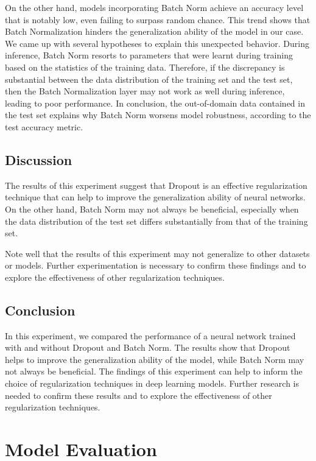\documentclass[a4paper]{article}
\begin{document}
On the other hand, models incorporating Batch Norm achieve an accuracy level that is notably low, even failing to surpass random chance. This trend shows that Batch Normalization hinders the generalization ability of the model in our case. We came up with several hypotheses to explain this unexpected behavior. During inference, Batch Norm resorts to parameters that were learnt during training based on the statistics of the training data. Therefore, if the discrepancy is substantial between the data distribution of the training set and the test set, then the Batch Normalization layer may not work as well during inference, leading to poor performance. In conclusion, the out-of-domain data contained in the test set explains why Batch Norm worsens model robustness, according to the test accuracy metric.

\subsection{Discussion}

The results of this experiment suggest that Dropout is an effective regularization technique that can help to improve the generalization ability of neural networks. On the other hand, Batch Norm may not always be beneficial, especially when the data distribution of the test set differs substantially from that of the training set.

Note well that the results of this experiment may not generalize to other datasets or models. Further experimentation is necessary to confirm these findings and to explore the effectiveness of other regularization techniques.


\subsection{Conclusion}

In this experiment, we compared the performance of a neural network trained with and without Dropout and Batch Norm. The results show that Dropout helps to improve the generalization ability of the model, while Batch Norm may not always be beneficial. The findings of this experiment can help to inform the choice of regularization techniques in deep learning models. Further research is needed to confirm these results and to explore the effectiveness of other regularization techniques.


\section{Model Evaluation}
\end{document}
